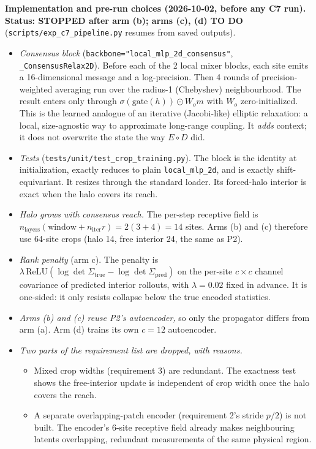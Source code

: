 \documentclass[11pt]{article}
\begin{document}
\textbf{Implementation and pre-run choices (2026-10-02, before any C7
run).} \textbf{Status: STOPPED after arm (b); arms (c), (d) TO DO} (\texttt{scripts/exp\_c7\_pipeline.py} resumes from saved outputs).
\begin{itemize}[leftmargin=*]
\item \emph{Consensus block}
  (\texttt{backbone="local\_mlp\_2d\_consensus"},
  \texttt{\_ConsensusRelax2D}). Before each of the 2 local mixer blocks,
  each site emits a 16-dimensional message and a log-precision. Then 4
  rounds of precision-weighted averaging run over the radius-1 (Chebyshev)
  neighbourhood. The result enters only through
  $\sigma(\mathrm{gate}(h))\odot W_o m$ with $W_o$ zero-initialized. This
  is the learned analogue of an iterative (Jacobi-like) elliptic
  relaxation: a local, size-agnostic way to approximate long-range
  coupling. It \emph{adds} context; it does not overwrite the state the
  way $E\circ D$ did.
\item \emph{Tests} (\texttt{tests/unit/test\_crop\_training.py}). The
  block is the identity at initialization, exactly reduces to plain
  \texttt{local\_mlp\_2d}, and is exactly shift-equivariant. It resizes
  through the standard loader. Its forced-halo interior is exact when the
  halo covers its reach.
\item \emph{Halo grows with consensus reach.} The per-step receptive field
  is $n_{\mathrm{layers}}(\text{window}+n_{\mathrm{iter}}r) = 2(3+4)=14$
  sites. Arms (b) and (c) therefore use 64-site crops (halo 14, free
  interior 24, the same as P2).
\item \emph{Rank penalty} (arm c). The penalty is
  $\lambda\,\mathrm{ReLU}(\log\det\Sigma_{\mathrm{true}} -
  \log\det\Sigma_{\mathrm{pred}})$ on the per-site $c{\times}c$ channel
  covariance of predicted interior rollouts, with $\lambda{=}0.02$ fixed
  in advance. It is one-sided: it only resists collapse below the true
  encoded statistics.
\item \emph{Arms (b) and (c) reuse P2's autoencoder,} so only the
  propagator differs from arm (a). Arm (d) trains its own $c{=}12$
  autoencoder.
\item \emph{Two parts of the requirement list are dropped, with reasons.}
  \begin{itemize}[leftmargin=*]
  \item Mixed crop widths (requirement 3) are redundant. The exactness test
    shows the free-interior update is independent of crop width once the
    halo covers the reach.
  \item A separate overlapping-patch encoder (requirement 2's stride
    $p/2$) is not built. The encoder's 6-site receptive field already makes
    neighbouring latents overlapping, redundant measurements of the same
    physical region.
  \end{itemize}
\end{itemize}
\end{document}
